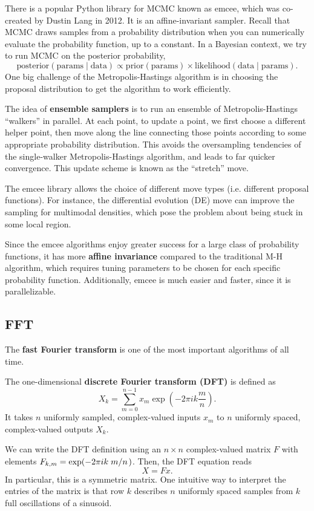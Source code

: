 \documentclass[12pt,letterpaper]{article}
\begin{document}
There is a popular Python library for MCMC known as emcee, which was co-created by Dustin Lang in 2012. It is an affine-invariant sampler. Recall that MCMC draws samples from a probability distribution when you can numerically evaluate the probability function, up to a constant. In a Bayesian context, we try to run MCMC on the posterior probability,
\[\text{posterior}(\text{params}\mid\text{data})\propto\text{prior}(\text{params})\times\text{likelihood}(\text{data}\mid\text{params}).\]
One big challenge of the Metropolis-Hastings algorithm is in choosing the proposal distribution to get the algorithm to work efficiently.

The idea of \textbf{ensemble samplers} is to run an ensemble of Metropolis-Hastings ``walkers'' in parallel. At each point, to update a point, we first choose a different helper point, then move along the line connecting those points according to some appropriate probability distribution. This avoids the oversampling tendencies of the single-walker Metropolis-Hastings algorithm, and leads to far quicker convergence. This update scheme is known as the ``stretch'' move.

The emcee library allows the choice of different move types (i.e. different proposal functions). For instance, the differential evolution (DE) move can improve the sampling for multimodal densities, which pose the problem about being stuck in some local region.

Since the emcee algorithms enjoy greater success for a large class of probability functions, it has more \textbf{affine invariance} compared to the traditional M-H algorithm, which requires tuning parameters to be chosen for each specific probability function. Additionally, emcee is much easier and faster, since it is parallelizable.
\subsection{FFT}
The \textbf{fast Fourier transform} is one of the most important algorithms of all time.
\begin{definition}
    The one-dimensional \textbf{discrete Fourier transform (DFT)} is defined as
    \[X_k=\sum_{m=0}^{n-1}x_m\exp(-2\pi ik\frac mn).\]
    It takes $n$ uniformly sampled, complex-valued inputs $x_m$ to $n$ uniformly spaced, complex-valued outputs $X_k$.
\end{definition}
We can write the DFT definition using an $n\times n$ complex-valued matrix $F$ with elements $F_{k,m}=\exp(-2\pi ik\flatfrac mn)$. Then, the DFT equation reads
\[X=Fx.\]
In particular, this is a symmetric matrix. One intuitive way to interpret the entries of the matrix is that row $k$ describes $n$ uniformly spaced samples from $k$ full oscillations of a sinusoid.
\end{document}
